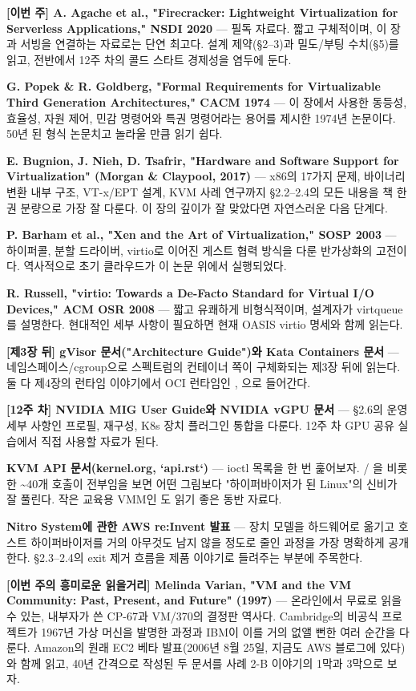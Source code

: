 \begin{tbbitemize}
  \item \textbf{[이번 주] A. Agache et al., "Firecracker: Lightweight Virtualization for Serverless Applications," NSDI 2020} — 필독 자료다. 짧고 구체적이며, 이 장과 서빙을 연결하는 자료로는 단연 최고다. 설계 제약(§2–3)과 밀도/부팅 수치(§5)를 읽고, 전반에서 12주 차의 콜드 스타트 경제성을 염두에 둔다.
  \item \textbf{G. Popek \& R. Goldberg, "Formal Requirements for Virtualizable Third Generation Architectures," CACM 1974} — 이 장에서 사용한 동등성, 효율성, 자원 제어, 민감 명령어와 특권 명령어라는 용어를 제시한 1974년 논문이다. 50년 된 형식 논문치고 놀라울 만큼 읽기 쉽다.
  \item \textbf{E. Bugnion, J. Nieh, D. Tsafrir, "Hardware and Software Support for Virtualization" (Morgan \& Claypool, 2017)} — x86의 17가지 문제, 바이너리 변환 내부 구조, VT-x/EPT 설계, KVM 사례 연구까지 §2.2–2.4의 모든 내용을 책 한 권 분량으로 가장 잘 다룬다. 이 장의 깊이가 잘 맞았다면 자연스러운 다음 단계다.
  \item \textbf{P. Barham et al., "Xen and the Art of Virtualization," SOSP 2003} — 하이퍼콜, 분할 드라이버, virtio로 이어진 게스트 협력 방식을 다룬 반가상화의 고전이다. 역사적으로 초기 클라우드가 이 논문 위에서 실행되었다.
  \item \textbf{R. Russell, "virtio: Towards a De-Facto Standard for Virtual I/O Devices," ACM OSR 2008} — 짧고 유쾌하게 비형식적이며, 설계자가 virtqueue를 설명한다. 현대적인 세부 사항이 필요하면 현재 OASIS virtio 명세와 함께 읽는다.
  \item \textbf{[제3장 뒤] gVisor 문서("Architecture Guide")와 Kata Containers 문서} — 네임스페이스/cgroup으로 스펙트럼의 컨테이너 쪽이 구체화되는 제3장 뒤에 읽는다. 둘 다 제4장의 런타임 이야기에서 OCI 런타임인 , 으로 들어간다.
  \item \textbf{[12주 차] NVIDIA MIG User Guide와 NVIDIA vGPU 문서} — §2.6의 운영 세부 사항인 프로필, 재구성, K8s 장치 플러그인 통합을 다룬다. 12주 차 GPU 공유 실습에서 직접 사용할 자료가 된다.
  \item \textbf{KVM API 문서(kernel.org, `api.rst`)} — ioctl 목록을 한 번 훑어보자.  / 을 비롯한 \textasciitilde{}40개 호출이 전부임을 보면 어떤 그림보다 "하이퍼바이저가 된 Linux"의 신비가 잘 풀린다. 작은 교육용 VMM인 도 읽기 좋은 동반 자료다.
  \item \textbf{Nitro System에 관한 AWS re:Invent 발표} — 장치 모델을 하드웨어로 옮기고 호스트 하이퍼바이저를 거의 아무것도 남지 않을 정도로 줄인 과정을 가장 명확하게 공개한다. §2.3–2.4의 exit 제거 흐름을 제품 이야기로 들려주는 부분에 주목한다.
  \item \textbf{[이번 주의 흥미로운 읽을거리] Melinda Varian, "VM and the VM Community: Past, Present, and Future" (1997)} — 온라인에서 무료로 읽을 수 있는, 내부자가 쓴 CP-67과 VM/370의 결정판 역사다. Cambridge의 비공식 프로젝트가 1967년 가상 머신을 발명한 과정과 IBM이 이를 거의 없앨 뻔한 여러 순간을 다룬다. Amazon의 원래 EC2 베타 발표(2006년 8월 25일, 지금도 AWS 블로그에 있다)와 함께 읽고, 40년 간격으로 작성된 두 문서를 사례 2-B 이야기의 1막과 3막으로 보자.
\end{tbbitemize}

